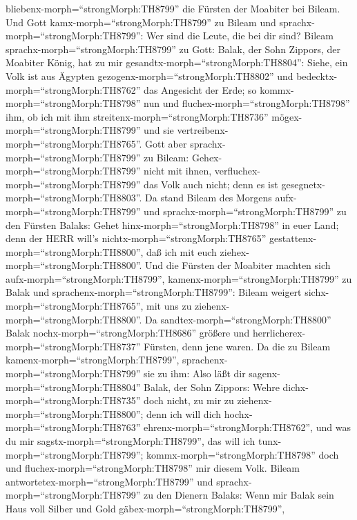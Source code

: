 bliebenx-morph=``strongMorph:TH8799'' die Fürsten der Moabiter bei
Bileam.  Und Gott kamx-morph=``strongMorph:TH8799'' zu
Bileam und sprachx-morph=``strongMorph:TH8799'': Wer sind die Leute, die
bei dir sind?  Bileam sprachx-morph=``strongMorph:TH8799''
zu Gott: Balak, der Sohn Zippors, der Moabiter König, hat zu mir
gesandtx-morph=``strongMorph:TH8804'':  Siehe, ein Volk ist
aus Ägypten gezogenx-morph=``strongMorph:TH8802'' und
bedecktx-morph=``strongMorph:TH8762'' das Angesicht der Erde; so
kommx-morph=``strongMorph:TH8798'' nun und
fluchex-morph=``strongMorph:TH8798'' ihm, ob ich mit ihm
streitenx-morph=``strongMorph:TH8736''
mögex-morph=``strongMorph:TH8799'' und sie
vertreibenx-morph=``strongMorph:TH8765''.  Gott aber
sprachx-morph=``strongMorph:TH8799'' zu Bileam:
Gehex-morph=``strongMorph:TH8799'' nicht mit ihnen,
verfluchex-morph=``strongMorph:TH8799'' das Volk auch nicht; denn es ist
gesegnetx-morph=``strongMorph:TH8803''.  Da stand Bileam
des Morgens aufx-morph=``strongMorph:TH8799'' und
sprachx-morph=``strongMorph:TH8799'' zu den Fürsten Balaks: Gehet
hinx-morph=``strongMorph:TH8798'' in euer Land; denn der HERR will's
nichtx-morph=``strongMorph:TH8765''
gestattenx-morph=``strongMorph:TH8800'', daß ich mit euch
ziehex-morph=``strongMorph:TH8800''.  Und die Fürsten der
Moabiter machten sich aufx-morph=``strongMorph:TH8799'',
kamenx-morph=``strongMorph:TH8799'' zu Balak und
sprachenx-morph=``strongMorph:TH8799'': Bileam weigert
sichx-morph=``strongMorph:TH8765'', mit uns zu
ziehenx-morph=``strongMorph:TH8800''.  Da
sandtex-morph=``strongMorph:TH8800'' Balak
nochx-morph=``strongMorph:TH8686'' größere und
herrlicherex-morph=``strongMorph:TH8737'' Fürsten, denn jene waren.
 Da die zu Bileam kamenx-morph=``strongMorph:TH8799'',
sprachenx-morph=``strongMorph:TH8799'' sie zu ihm: Also läßt dir
sagenx-morph=``strongMorph:TH8804'' Balak, der Sohn Zippors: Wehre
dichx-morph=``strongMorph:TH8735'' doch nicht, zu mir zu
ziehenx-morph=``strongMorph:TH8800'';  denn ich will dich
hochx-morph=``strongMorph:TH8763'' ehrenx-morph=``strongMorph:TH8762'',
und was du mir sagstx-morph=``strongMorph:TH8799'', das will ich
tunx-morph=``strongMorph:TH8799''; kommx-morph=``strongMorph:TH8798''
doch und fluchex-morph=``strongMorph:TH8798'' mir diesem Volk.
 Bileam antwortetex-morph=``strongMorph:TH8799'' und
sprachx-morph=``strongMorph:TH8799'' zu den Dienern Balaks: Wenn mir
Balak sein Haus voll Silber und Gold gäbex-morph=``strongMorph:TH8799'',
